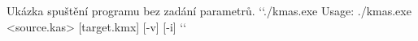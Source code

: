 \begin{console}{Ukázka spuštění programu bez zadání parametrů.}
`\uxprompt`./kmas.exe
Usage: ./kmas.exe <source.kas> [target.kmx] [-v] [-i]
`\uxprompt`
\end{console}
